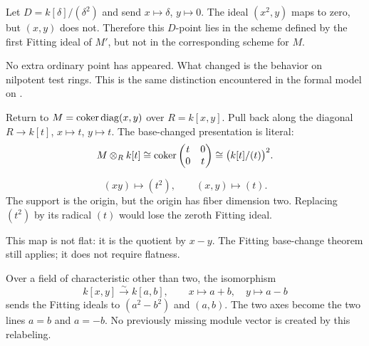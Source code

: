 Let $D=k[\delta]/(\delta^2)$ and send $x\mapsto\delta$, $y\mapsto0$. The ideal $(x^2,y)$ maps to zero, but $(x,y)$ does not. Therefore this $D$-point lies in the scheme defined by the first Fitting ideal of $M'$, but not in the corresponding scheme for $M$.

No extra ordinary point has appeared. What changed is the behavior on nilpotent test rings. This is the same distinction encountered in the formal model on .


Return to $M=\operatorname{coker}\operatorname{diag}(x,y)$ over $R=k[x,y]$. Pull back along the diagonal $R\to k[t]$, $x\mapsto t$, $y\mapsto t$. The base-changed presentation is literal:
\[
M\otimes_R k[t]\cong\operatorname{coker}\begin{pmatrix}t&0\\0&t\end{pmatrix}
\cong\bigl(k[t]/(t)\bigr)^2.
\]

\begin{minipage}[c]{.44\linewidth}
\end{minipage}\hfill
\begin{minipage}[c]{.51\linewidth}
\[
(xy)\longmapsto(t^2),\qquad
(x,y)\longmapsto(t).
\]
The support is the origin, but the origin has fiber dimension two. Replacing $(t^2)$ by its radical $(t)$ would lose the zeroth Fitting ideal.

This map is not flat: it is the quotient by $x-y$. The Fitting base-change theorem still applies; it does not require flatness.
\end{minipage}

Over a field of characteristic other than two, the isomorphism
\[
k[x,y]\xrightarrow{\sim}k[a,b],\qquad x\mapsto a+b,\quad y\mapsto a-b
\]
sends the Fitting ideals to $(a^2-b^2)$ and $(a,b)$. The two axes become the two lines $a=b$ and $a=-b$. No previously missing module vector is created by this relabeling.

